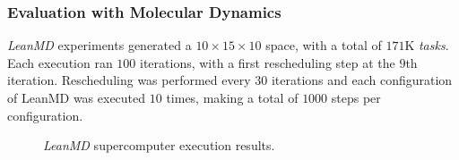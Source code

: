 \subsubsection{Evaluation with Molecular Dynamics} \label{sec:sdumont:md}

\textit{LeanMD} experiments generated a $10\times15\times10$ space, with a total of $171$K \textit{tasks}.
Each execution ran $100$ iterations, with a first rescheduling step at the $9$th iteration. 
Rescheduling was performed every $30$ iterations and each configuration of LeanMD was executed $10$ times, making a total of $1000$ steps per configuration. 

%	

\begin{figure}[!ht]
 \centering
 \caption{\textit{LeanMD} supercomputer execution results.}
 \label{fig:eval:sdumont:leanmd}
\end{figure}

